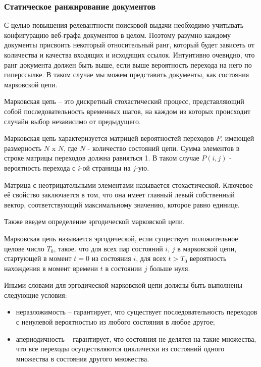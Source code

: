 \subsubsection{Статическое ранжирование документов}

С целью повышения релевантности поисковой выдачи необходимо учитывать конфигурацию веб-графа документов в целом. Поэтому разумно каждому документы присвоить некоторый относительный ранг, который будет зависеть от количества и качества входящих и исходящих ссылок. Интуитивно очевидно, что ранг документа должен быть выше, если выше вероятность перехода на него по гиперссылке. В таком случае мы можем представить документы, как состояния марковской цепи. 

Марковская цепь -- это дискретный стохастический процесс, представляющий собой последовательность временных шагов, на каждом из которых происходит случайн выбор независимо от предыдущего.

Марковская цепь характеризуется матрицей вероятностей переходов $P$, имеющей размерность $N$ x $N$, где $N$ - количество состояний цепи. Сумма элементов в строке матрицы переходов должна равняться 1. В таком случае $P(i, j)$ - вероятность перехода с $i$-ой страницы на $j$-ую.

Матрица с неотрицательными элементами называется стохастической. Ключевое её свойство заключается в том, что она имеет главный левый собственный вектор, соответствующий максимальному значению, которое равно единице.

Также введем определение эргодической марковской цепи.

Марковская цепь называется эргодической, если существует положительное целове число $T_0$, такое. что для всех пар состояний $i$, $j$ в марковской цепи, стартующей в момент $t = 0$ из состояния $i$, для всех $t > T_0$ вероятность нахождения в момент времени $t$ в состоянии $j$ больше нуля.

Иными словами для эргодической марковской цепи должны быть выполнены следующие условия:
\begin{itemize}
\item неразложимость -- гарантирует, что существует последовательность переходов с ненулевой вероятностью из любого состояния в любое другое;
\item апериодичность -- гарантирует, что состояния не делятся на такие множества, что все переходы осуществляются циклически из состояний одного множества в состояния другого множества.
\end{itemize}

